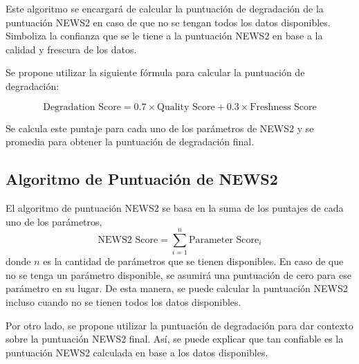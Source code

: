 Este algoritmo se encargará de calcular la puntuación de degradación de la puntuación NEWS2 en caso de que no se tengan todos los datos disponibles.
Simboliza la confianza que se le tiene a la puntuación NEWS2 en base a la calidad y frescura de los datos.\newline

Se propone utilizar la siguiente fórmula para calcular la puntuación de degradación:

\begin{equation}
    \text{Degradation Score} = 0.7 \times \text{Quality Score} + 0.3 \times \text{Freshness Score}
\end{equation}

Se calcula este puntaje para cada uno de los parámetros de NEWS2 y se promedia para obtener la puntuación de degradación final.

\subsection{Algoritmo de Puntuación de NEWS2}

El algoritmo de puntuación NEWS2 se basa en la suma de los puntajes de cada uno de los parámetros,
\begin{equation}
    \text{NEWS2 Score} = \sum_{i=1}^{n} \text{Parameter Score}_i
\end{equation}
donde $n$ es la cantidad de parámetros que se tienen disponibles.
En caso de que no se tenga un parámetro disponible, se asumirá una puntuación de cero para ese parámetro en su lugar.
De esta manera, se puede calcular la puntuación NEWS2 incluso cuando no se tienen todos los datos disponibles.\newline

Por otro lado, se propone utilizar la puntuación de degradación para dar contexto sobre la puntuación NEWS2 final.
Así, se puede explicar que tan confiable es la puntuación NEWS2 calculada en base a los datos disponibles.